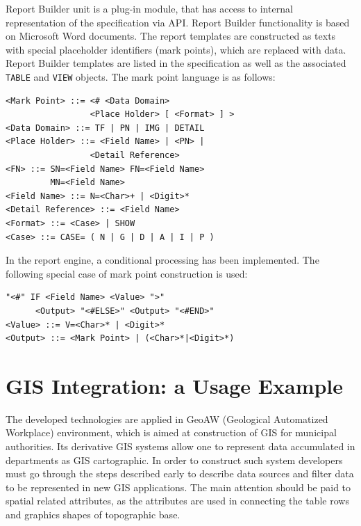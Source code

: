 \documentclass[conference]{IEEEtran}
\begin{document}
Report Builder unit is a plug-in module, that has access to internal representation of the specification via API.  Report Builder functionality is based on Microsoft Word documents.  The report templates are constructed as texts with special placeholder identifiers (mark points), which are replaced with data.  Report Builder templates are listed in the specification as well as the associated \texttt{TABLE} and \texttt{VIEW} objects.  The mark point language is as follows:

\begin{lstlisting}
<Mark Point> ::= <# <Data Domain>
                 <Place Holder> [ <Format> ] >
<Data Domain> ::= TF | PN | IMG | DETAIL
<Place Holder> ::= <Field Name> | <PN> |
                 <Detail Reference>
<FN> ::= SN=<Field Name> FN=<Field Name>
         MN=<Field Name>
<Field Name> ::= N=<Char>+ | <Digit>*
<Detail Reference> ::= <Field Name>
<Format> ::= <Case> | SHOW
<Case> ::= CASE= ( N | G | D | A | I | P )
\end{lstlisting}

In the report engine, a conditional processing has been implemented.  The following special case of mark point construction is used:

\begin{lstlisting}
"<#" IF <Field Name> <Value> ">"
      <Output> "<#ELSE>" <Output> "<#END>"
<Value> ::= V=<Char>* | <Digit>*
<Output> ::= <Mark Point> | (<Char>*|<Digit>*)
\end{lstlisting}


\section{GIS Integration: a Usage Example}
\label{sec:gis-integration}

The developed technologies are applied in GeoAW (Geological Automatized Workplace) environment, which is aimed at construction of GIS for municipal authorities.  Its derivative GIS systems allow one to represent data accumulated in departments as GIS cartographic.  In order to construct such system developers must go through the steps described early to describe data sources and filter data to be represented in new GIS applications.  The main attention should be paid to spatial related attributes, as the attributes are used in connecting the table rows and graphics shapes of topographic base.
\end{document}
